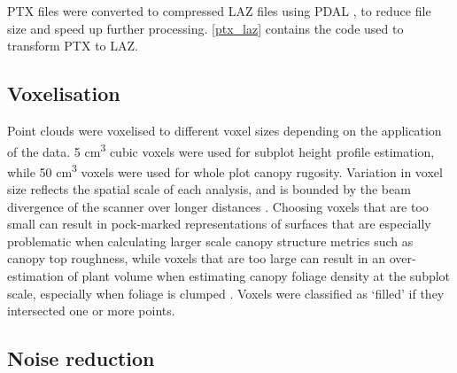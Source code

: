 \documentclass[11pt,a4paper]{article}
\begin{document}


PTX files were converted to compressed LAZ files using PDAL \citep{PDAL}, to reduce file size and speed up further processing. \autoref{ptx_laz} contains the code used to transform PTX to LAZ. 

\vspace{\baselineskip}
\begin{minipage}{\linewidth}

\end{minipage}

\vspace{\baselineskip}
\begin{minipage}{\linewidth}
	
\end{minipage}

\subsection{Voxelisation}

Point clouds were voxelised to different voxel sizes depending on the application of the data. 5 cm\textsuperscript{3} cubic voxels were used for subplot height profile estimation, while 50 cm\textsuperscript{3} voxels were used for whole plot canopy rugosity. Variation in voxel size reflects the spatial scale of each analysis, and is bounded by the beam divergence of the scanner over longer distances \citep{Grau2017}. Choosing voxels that are too small can result in pock-marked representations of surfaces that are especially problematic when calculating larger scale canopy structure metrics such as canopy top roughness, while voxels that are too large can result in an over-estimation of plant volume when estimating canopy foliage density at the subplot scale, especially when foliage is clumped \citep{Seidel2012, Cifuentes2014}. Voxels were classified as `filled' if they intersected one or more points. 

\subsection{Noise reduction}
\end{document}
